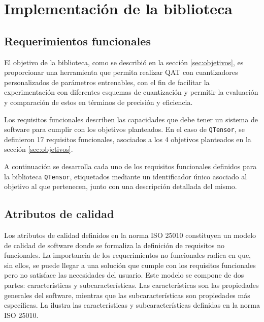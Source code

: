 \section{Implementación de la biblioteca}
\label{sec:implementacion}

\subsection{Requerimientos funcionales}
\label{sec:requerimientos_funcionales}

El objetivo de la biblioteca, como se describió en la sección \ref{sec:objetivos}, es proporcionar una herramienta que permita realizar QAT con cuantizadores personalizados de parámetros entrenables, con el fin de facilitar la experimentación con diferentes esquemas de cuantización y permitir la evaluación y comparación de estos en términos de precisión y eficiencia.

Los requisitos funcionales describen las capacidades que debe tener un sistema de software para cumplir con los objetivos planteados. En el caso de \texttt{QTensor}, se definieron 17 requisitos funcionales, asociados a los 4 objetivos planteados en la sección \ref{sec:objetivos}.

A continuación se desarrolla cada uno de los requisitos funcionales definidos para la biblioteca \texttt{QTensor}, etiquetados mediante un identificador único asociado al objetivo al que pertenecen, junto con una descripción detallada del mismo.

% 


\subsection{Atributos de calidad}
\label{sec:atributos_calidad}

Los atributos de calidad definidos en la norma ISO 25010 \cite{ISO25010} constituyen un modelo de calidad de software donde se formaliza la definición de requisitos no funcionales. La importancia de los requerimientos no funcionales radica en que, sin ellos, se puede llegar a una solución que cumple con los requisitos funcionales pero no satisface las necesidades del usuario. Este modelo se compone de dos partes: características y subcaracterísticas. Las características son las propiedades generales del software, mientras que las subcaracterísticas son propiedades más específicas. La  ilustra las características y subcaracterísticas definidas en la norma ISO 25010.

